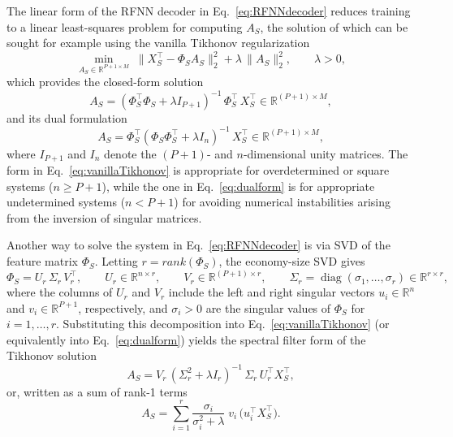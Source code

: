 \documentclass{article}
\begin{document}
The linear form of the RFNN decoder in Eq.~\eqref{eq:RFNNdecoder} reduces training to a linear least-squares problem for computing $A_S$, the solution of which can be sought for example using the vanilla Tikhonov regularization
\begin{equation}\label{eq:obj-row}
\min_{A_S\in\mathbb{R}^{P+1\times M}} \; 
\big\|X^{\top}_S - \Phi_S A_S \big\|_2^2 + \lambda\,\|A_S\|_2^2,
\qquad \lambda>0,
\end{equation}
which provides the closed-form solution
\begin{equation}\label{eq:vanillaTikhonov}
A_S = (\Phi_S^\top \Phi_S + \lambda I_{P+1})^{-1}\, \Phi_S^\top \, X^{\top}_S \in\mathbb{R}^{(P+1)\times M},
\end{equation}
and its dual formulation
\begin{equation}
A_S = \Phi^\top_S (\Phi_S \Phi^\top_S + \lambda I_n)^{-1}\, X^{\top}_S \in\mathbb{R}^{(P+1)\times M},
\label{eq:dualform}
\end{equation}
where $I_{P+1}$ and $I_n$ denote the $(P+1)$- and $n$-dimensional unity matrices. The form in Eq.~\eqref{eq:vanillaTikhonov} is appropriate for overdetermined or square systems ($n\ge P+1$), while the one in Eq.~\eqref{eq:dualform} is for appropriate undetermined systems ($n< P+1$) for avoiding numerical instabilities arising from the inversion of singular matrices. 

Another way to solve the system in Eq.~\eqref{eq:RFNNdecoder} is via SVD of the feature matrix $\Phi_S$. Letting $r=rank(\Phi_S)$, the economy-size SVD gives
\begin{equation}
\Phi_S = U_r \,\Sigma_r\, V_r^\top, \qquad U_r \in \mathbb{R}^{n\times r}, \qquad
V_r \in \mathbb{R}^{(P+1)\times r}, \qquad
\Sigma_r = \operatorname{diag}(\sigma_1,\dots,\sigma_r) \in \mathbb{R}^{r\times r},
\end{equation}
where the columns of $U_r$ and $V_r$ include the left and right singular vectors $u_i \in \mathbb{R}^n$ and $v_i \in \mathbb{R}^{P+1}$, respectively, and $\sigma_i>0$ are the singular values of $\Phi_S$ for $i=1,\ldots,r$. Substituting this decomposition into Eq.~\eqref{eq:vanillaTikhonov} (or equivalently into Eq.~\eqref{eq:dualform}) yields the spectral filter form of the Tikhonov solution
\begin{equation}
A_S=V_r\,(\Sigma_r^{2}+\lambda I_r)^{-1}\,\Sigma_r\, U_r^{\top} X_S^{\top},
\label{eq:TikhSVD}
\end{equation}
or, written as a sum of rank-1 terms
\begin{equation}
A_S=\sum_{i=1}^{r} \frac{\sigma_i}{\sigma_i^2 + \lambda}\; v_i \,\bigl(u_i^{\!\top} X^{\top}_S\bigr).
\end{equation}
\end{document}
